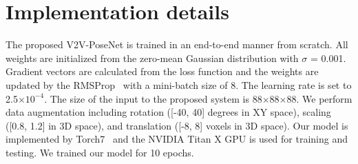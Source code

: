 \section{Implementation details}
The proposed V2V-PoseNet is trained in an end-to-end manner from scratch. All weights are initialized from the zero-mean Gaussian distribution with $\sigma$ = 0.001. Gradient vectors are calculated from the loss function and the weights are updated by the RMSProp~\cite{tieleman2012lecture} with a mini-batch size of 8. The learning rate is set to 2.5$\times$$10^{-4}$. The size of the input to the proposed system is 88$\times$88$\times$88. We perform data augmentation including rotation ([-40, 40] degrees in XY space), scaling ([0.8, 1.2] in 3D space), and translation ([-8, 8] voxels in 3D space). Our model is implemented by Torch7~\cite{collobert2011torch7} and the NVIDIA Titan X GPU is used for training and testing. We trained our model for 10 epochs.

